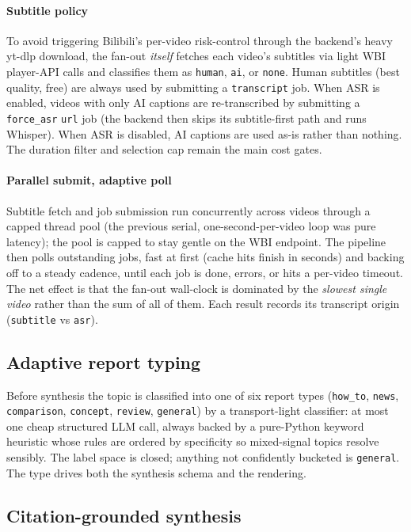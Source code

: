 \documentclass[conference]{IEEEtran}
\begin{document}
\paragraph{Subtitle policy} To avoid triggering Bilibili's per-video risk-control
through the backend's heavy yt-dlp download, the fan-out \emph{itself} fetches
each video's subtitles via light WBI player-API calls and classifies them as
\texttt{human}, \texttt{ai}, or \texttt{none}. Human subtitles (best quality,
free) are always used by submitting a \texttt{transcript} job. When ASR is
enabled, videos with only AI captions are re-transcribed by submitting a
\texttt{force\_asr} \texttt{url} job (the backend then skips its subtitle-first
path and runs Whisper). When ASR is disabled, AI captions are used as-is rather
than nothing. The duration filter and selection cap remain the main cost gates.

\paragraph{Parallel submit, adaptive poll} Subtitle fetch and job submission run
concurrently across videos through a capped thread pool (the previous serial,
one-second-per-video loop was pure latency); the pool is capped to stay gentle on
the WBI endpoint. The pipeline then polls outstanding jobs, fast at first (cache
hits finish in seconds) and backing off to a steady cadence, until each job is
done, errors, or hits a per-video timeout. The net effect is that the fan-out
wall-clock is dominated by the \emph{slowest single video} rather than the sum
of all of them. Each result records its transcript origin (\texttt{subtitle} vs
\texttt{asr}).

\subsection{Adaptive report typing}

Before synthesis the topic is classified into one of six report types
(\texttt{how\_to}, \texttt{news}, \texttt{comparison}, \texttt{concept},
\texttt{review}, \texttt{general}) by a transport-light classifier: at most one
cheap structured LLM call, always backed by a pure-Python keyword heuristic whose
rules are ordered by specificity so mixed-signal topics resolve sensibly. The
label space is closed; anything not confidently bucketed is \texttt{general}. The
type drives both the synthesis schema and the rendering.

\subsection{Citation-grounded synthesis}
\label{sec:synth}
\end{document}
